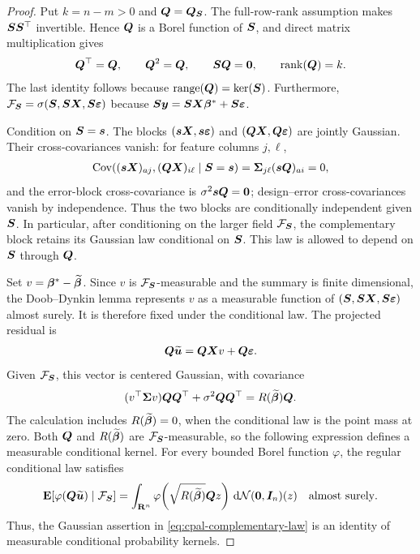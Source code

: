 \documentclass{article}
\theoremstyle{plain} %
\theoremstyle{definition} %
\theoremstyle{definition} %
\begin{document}
\begin{proof}
Put $k=n-m>0$ and $\boldsymbol{Q}=\boldsymbol{Q}_{\boldsymbol{S}}$. The full-row-rank
assumption makes $\boldsymbol{S}\boldsymbol{S}^\top$ invertible. Hence $\boldsymbol{Q}$ is a Borel
function of $\boldsymbol{S}$, and direct matrix multiplication gives
\begin{align*}
    \boldsymbol{Q}^\top=\boldsymbol{Q},\qquad \boldsymbol{Q}^2=\boldsymbol{Q},\qquad
    \boldsymbol{S}\boldsymbol{Q}=\mathbf{0},\qquad \operatorname{rank}(\boldsymbol{Q})=k.
\end{align*}
The last identity follows because $\operatorname{range}(\boldsymbol{Q})=\ker(\boldsymbol{S})$.
     Furthermore, ${\mathcal F}_{\boldsymbol{S}}=\sigma(\boldsymbol{S},\boldsymbol{S}\boldsymbol{X},\boldsymbol{S}{\boldsymbol{\varepsilon} })$ because
$\boldsymbol{S}\boldsymbol{y}=\boldsymbol{S}\boldsymbol{X}\boldsymbol{\beta}^*+\boldsymbol{S}{\boldsymbol{\varepsilon} }$. 

Condition on $\boldsymbol{S}=\boldsymbol{s}$. The blocks
$(\boldsymbol{s}\boldsymbol{X},\boldsymbol{s}{\boldsymbol{\varepsilon} })$ and $(\boldsymbol{Q}\boldsymbol{X},\boldsymbol{Q}{\boldsymbol{\varepsilon} })$ are jointly Gaussian.
Their cross-covariances vanish: for feature columns $j,\ell$,
\begin{align*}
    \operatorname{Cov}\!\left(
      (\boldsymbol{s}\boldsymbol{X})_{aj},(\boldsymbol{Q}\boldsymbol{X})_{i\ell}\mid\boldsymbol{S}=\boldsymbol{s}
    \right)
    =\boldsymbol{\Sigma}_{j\ell}(\boldsymbol{s}\boldsymbol{Q})_{ai}=0,
\end{align*}
and the error-block cross-covariance is
$\sigma^2\boldsymbol{s}\boldsymbol{Q}=\mathbf{0}$; design--error cross-covariances vanish by
independence. Thus the two blocks are conditionally independent given
$\boldsymbol{S}$. In particular, after conditioning on the larger field
${\mathcal F}_{\boldsymbol{S}}$, the complementary block retains its Gaussian law
conditional on $\boldsymbol{S}$. This law is allowed to depend on $\boldsymbol{S}$ through
$\boldsymbol{Q}$.

Set $v=\boldsymbol{\beta}^*-\widetilde{\boldsymbol{\beta}}$. Since $v$ is
${\mathcal F}_{\boldsymbol{S}}$-measurable and the summary is finite dimensional, the
Doob--Dynkin lemma represents $v$ as a measurable function of
$(\boldsymbol{S},\boldsymbol{S}\boldsymbol{X},\boldsymbol{S}{\boldsymbol{\varepsilon} })$ almost surely. It is therefore fixed under the
conditional law. The projected residual is
\begin{align*}
    \boldsymbol{Q}\widetilde{\boldsymbol{u}}=\boldsymbol{Q}\boldsymbol{X} v+\boldsymbol{Q}{\boldsymbol{\varepsilon} }.
\end{align*}
Given ${\mathcal F}_{\boldsymbol{S}}$, this vector is centered Gaussian, with covariance
\begin{align*}
    (v^\top\boldsymbol{\Sigma} v)\boldsymbol{Q}\boldsymbol{Q}^\top
       +\sigma^2\boldsymbol{Q}\boldsymbol{Q}^\top
    =R(\widetilde{\boldsymbol{\beta}})\boldsymbol{Q}.
\end{align*}
The calculation includes $R(\widetilde{\boldsymbol{\beta}})=0$, when the conditional
law is the point mass at zero. Both $\boldsymbol{Q}$ and $R(\widetilde{\boldsymbol{\beta}})$ are
${\mathcal F}_{\boldsymbol{S}}$-measurable, so the following expression defines a measurable
conditional kernel. For every bounded Borel
function $\varphi$, the regular conditional law satisfies
\begin{align*}
    {\mathbf{E}}[\varphi(\boldsymbol{Q}\widetilde{\boldsymbol{u}})\mid{\mathcal F}_{\boldsymbol{S}}]
    =\int_{{\mathbf{R}}^n}
      \varphi\!\left(\sqrt{R(\widetilde{\boldsymbol{\beta}})}
        \boldsymbol{Q} z\right)\,\mathrm d{\mathcal N}(\mathbf{0},\boldsymbol{I}_n)(z)
    \quad\text{almost surely}.
\end{align*}
Thus, the Gaussian assertion in \eqref{eq:cpal-complementary-law} is an
identity of measurable conditional probability kernels.


\end{proof}
\end{document}
